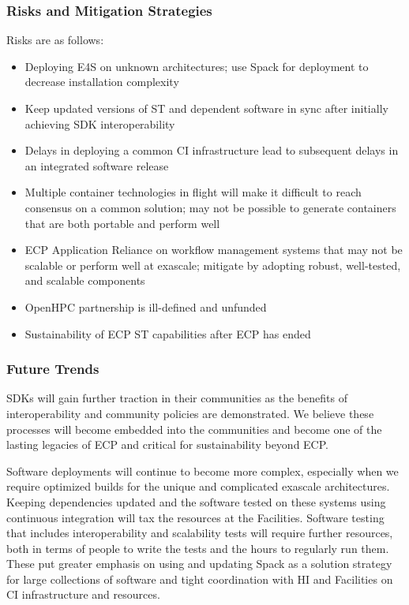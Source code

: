 \subsubsection{Risks and Mitigation Strategies}
Risks are as follows:
\begin{itemize}
	\item Deploying E4S on unknown architectures; use Spack for deployment to decrease installation complexity
    \item Keep updated versions of ST and dependent software in sync after initially achieving SDK interoperability
	\item Delays in deploying a common CI infrastructure lead to subsequent delays in an integrated software release
	\item Multiple container technologies in flight will make it difficult to reach consensus on a common solution; may not be possible to generate containers that are both portable and perform well
	\item ECP Application Reliance on workflow management systems that may not be scalable or perform well at exascale; mitigate by adopting robust, well-tested, and scalable components
	\item OpenHPC partnership is ill-defined and unfunded
	\item Sustainability of ECP ST capabilities after ECP has ended
\end{itemize}

\subsubsection{Future Trends}

SDKs will gain further traction in their communities as the benefits of 
interoperability and community policies are demonstrated.  We believe these processes will
become embedded into the communities and become one of the lasting legacies of ECP and
critical for sustainability beyond ECP.

Software deployments will continue to become more complex, especially when we require optimized 
builds for the unique and complicated exascale architectures.  Keeping dependencies updated and 
the software tested on these systems using continuous integration will tax the resources at 
the Facilities.  Software testing that includes interoperability and scalability tests will 
require further resources, both in terms of people to write the tests and the hours to
regularly run them.  These put greater emphasis on using and updating Spack as a
solution strategy for large collections of software and tight coordination with
HI and Facilities on CI infrastructure and resources.

